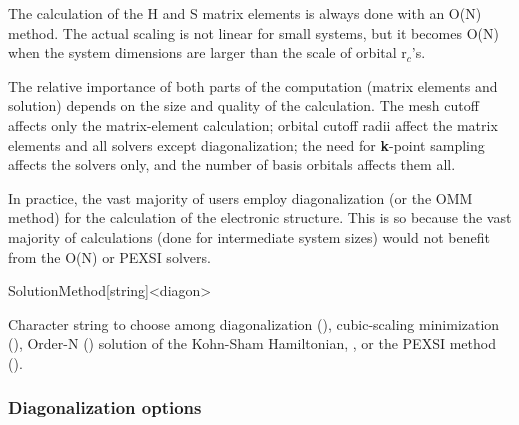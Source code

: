 The calculation of the H and S matrix elements is always done with an
O(N) method. The actual scaling is not linear for small systems, but
it becomes O(N) when the system dimensions are larger than the scale
of orbital r$_c$'s.

The relative importance of both parts of the computation (matrix
elements and solution) depends on the size and quality of the
calculation. The mesh cutoff affects only the matrix-element
calculation; orbital cutoff radii affect the matrix elements and all
solvers except diagonalization; the need for \textbf{k}-point sampling
affects the solvers only, and the number of basis orbitals affects
them all.

In practice, the vast majority of users employ diagonalization (or the
OMM method) for the calculation of the electronic structure. This is
so because the vast majority of calculations (done for intermediate
system sizes) would not benefit from the O(N) or PEXSI solvers.

\begin{fdfentry}{SolutionMethod}[string]<diagon>

  Character string to choose among diagonalization (),
  cubic-scaling minimization (), Order-N ()
  solution of the Kohn-Sham Hamiltonian, , or the
  PEXSI method ().
  
\end{fdfentry}


\subsubsection{Diagonalization options}

